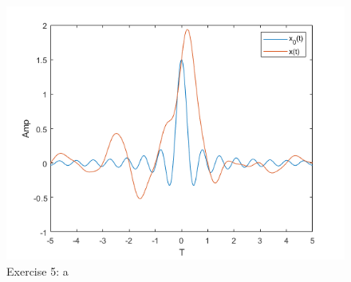 \documentclass[a4paper]{article}
\begin{document}
\begin{figure}
    \centering
    \includegraphics{5a.png}
    \caption{Exercise 5: a}
    \label{fig:5a}
\end{figure}
\end{document}
